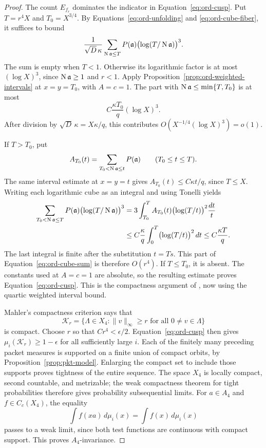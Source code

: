 \begin{proof}
The count \(E_{f_r}\) dominates the indicator in
Equation~\eqref{eq:ord-cusp}.  Put \(T=r^4X\) and \(T_0=X^{3/4}\).
By Equations~\eqref{eq:ord-unfolding} and \eqref{eq:ord-cube-fiber},
it suffices to bound
\begin{equation}\label{eq:ord-cube-sum}
 \frac1{\sqrt D\,\kappa}
 \sum_{\operatorname{N}\mathfrak a\le T}
       P(\mathfrak a)
       \bigl(\log(T/\operatorname{N}\mathfrak a)\bigr)^3 .
\end{equation}
The sum is empty when \(T<1\).  Otherwise its logarithmic factor is
at most \((\log X)^3\), since \(\operatorname{N}\mathfrak a\ge1\) and \(r<1\).
Apply Proposition~\ref{prop:ord-weighted-intervals} at
\(x=y=T_0\), with \(A=c=1\).  The part with
\(\operatorname{N}\mathfrak a\le\min\{T,T_0\}\) is at most
\[
 C\frac{\kappa T_0}{q}(\log X)^3.
\]
After division by \(\sqrt D\,\kappa=X\kappa/q\), this contributes
\(O(X^{-1/4}(\log X)^3)=o(1)\).

If \(T>T_0\), put
\[
 A_{T_0}(t)=\sum_{T_0<\operatorname{N}\mathfrak a\le t}P(\mathfrak a)
 \qquad(T_0\le t\le T).
\]
The same interval estimate at \(x=y=t\) gives
\(A_{T_0}(t)\le C\kappa t/q\), since \(T\le X\).  Writing each
logarithmic cube as an integral and using Tonelli yields
\begin{align*}
 \sum_{T_0<\operatorname{N}\mathfrak a\le T}
       P(\mathfrak a)\bigl(\log(T/\operatorname{N}\mathfrak a)\bigr)^3
 &=3\int_{T_0}^T A_{T_0}(t)
                   \bigl(\log(T/t)\bigr)^2\frac{dt}{t}\\
 &\le C\frac{\kappa}{q}
              \int_0^T\bigl(\log(T/t)\bigr)^2\,dt
 \le C\frac{\kappa T}{q}.
\end{align*}
The last integral is finite after the substitution \(t=Ts\).
This part of Equation~\eqref{eq:ord-cube-sum} is therefore \(O(r^4)\).
If \(T\le T_0\), it is absent.  The constants used at \(A=c=1\) are
absolute, so the resulting estimate proves
Equation~\eqref{eq:ord-cusp}.  This is the compactness argument of
\cite[Proposition~5.1]{PrimeDegreePackets}, now using the quartic
weighted interval bound.

Mahler's compactness criterion \cite[Section~3, Theorem~2]{Mahler1946}
says that
\[
 \mathcal K_r=\{\Lambda\in X_4:\|v\|_\infty\ge r
                                      \text{ for all }0\ne v\in\Lambda\}
\]
is compact.  Choose \(r\) so that \(Cr^4<\epsilon/2\).
Equation~\eqref{eq:ord-cusp} then gives
\(\mu_i(\mathcal K_r)\ge1-\epsilon\) for all sufficiently large \(i\).
Each of the finitely many preceding packet measures is supported on a
finite union of compact orbits, by Proposition~\ref{prop:pkt-model}.
Enlarging the compact set to include those supports proves tightness
of the entire sequence.  The space \(X_4\) is locally compact,
second countable, and metrizable; the weak compactness theorem for
tight probabilities therefore gives probability subsequential limits.
For \(a\in A_4\) and \(f\in C_c(X_4)\), the equality
\[
 \int f(xa)\,d\mu_i(x)=\int f(x)\,d\mu_i(x)
\]
passes to a weak limit, since both test functions are continuous with
compact support.  This proves \(A_4\)-invariance.
\end{proof}

